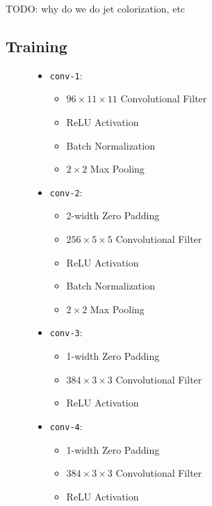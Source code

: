 TODO: why do we do jet colorization, etc 







\subsection{Training}





\begin{figure}
\begin{mdframed}
\begin{itemize}
    \item \texttt{conv-1}:
    \begin{itemize}
        \item $96 \times 11 \times 11$ Convolutional Filter
        \item ReLU Activation
        \item Batch Normalization
        \item $2 \times 2$ Max Pooling
    \end{itemize}
    \item \texttt{conv-2}:
    \begin{itemize}
        \item 2-width Zero Padding
        \item $256 \times 5 \times 5$ Convolutional Filter
        \item ReLU Activation
        \item Batch Normalization
        \item $2 \times 2$ Max Pooling
    \end{itemize}
    \item \texttt{conv-3}:
    \begin{itemize}
        \item 1-width Zero Padding
        \item $384 \times 3 \times 3$ Convolutional Filter
        \item ReLU Activation
    \end{itemize}
    \item \texttt{conv-4}:
    \begin{itemize}
        \item 1-width Zero Padding
        \item $384 \times 3 \times 3$ Convolutional Filter
        \item ReLU Activation

\end{itemize}
\end{itemize}
\end{mdframed}
\end{figure}
